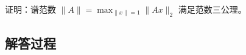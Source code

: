 \begin{example}[谱范数性质]
    证明：谱范数 \( \|A\| = \max_{\|x\|=1} \|Ax\|_2 \) 满足范数三公理。
    \end{example}
    
    \subsection*{解答过程}
    